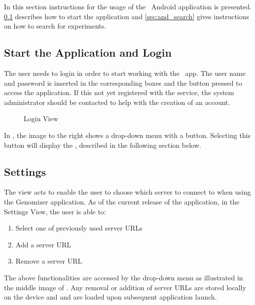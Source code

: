 In this section instructions for the usage of the \appName\ Android application is presented. \ref{sec:and_start} describes how to start the application and \ref{sec:and_search} gives instructions on how to search for experiments.

\subsection{Start the Application and Login}
\label{sec:and_start}


The user needs to login in order to start working with the \appName\ app. The  user name and password is inserted in the corresponding boxes and the  button pressed to access the application. If this not yet
registered with the service, the system administrator should be contacted to help with the creation of an account.

\begin{figure}[h]
\caption{Login View}
\label{fig:and_login_man}
\end{figure}
\FloatBarrier


In , the image to the right shows a drop-down menu with a  button. Selecting this button will display the , described in the following  section below.

\subsection{Settings}
The  view acts to enable the user to choose which server to connect to when using the Genomizer application. As of the current release of the application, in the Settings View, the user is able to:

\begin{enumerate}
\item Select one of previously used server URLs
\item Add a server URL
\item Remove a server URL
\end{enumerate}

The above functionalities are accessed by the drop-down menu as illustrated in the middle image  of  . Any removal or addition of server URLs are stored locally on the device and and are loaded upon subsequent application launch.


